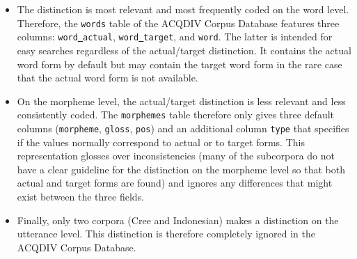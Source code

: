 \documentclass[a4paper, 11pt]{book}
\newcommand{\und}{\underline{{ }}\hspace{0.2mm}}	%
\begin{document}
\begin{itemize}
	\item The distinction is most relevant and most frequently coded on the word level. Therefore, the \texttt{words} table of the ACQDIV Corpus Database
		features three columns: \texttt{word\und actual}, \texttt{word\und target}, and \texttt{word}. The latter is intended for easy searches
		regardless of the actual/target distinction. It contains the actual word form by default but may contain the target word form in the rare
		case that the actual word form is not available.
	\item On the morpheme level, the actual/target distinction is less relevant and less consistently coded. The \texttt{morphemes} table
		therefore only gives three default columns (\texttt{morpheme}, \texttt{gloss}, \texttt{pos}) and an additional column \texttt{type}
		that specifies if the values normally correspond to actual or to target forms. This representation glosses over inconsistencies (many of the subcorpora 
		do not have a clear guideline for the distinction on the morpheme level so that both actual and target forms are found) and ignores any 
		differences that might exist between the three fields. 
	\item Finally, only two corpora (Cree and Indonesian) makes a distinction on the utterance level. This distinction is therefore completely ignored in the ACQDIV Corpus Database. 
\end{itemize}
\end{document}
